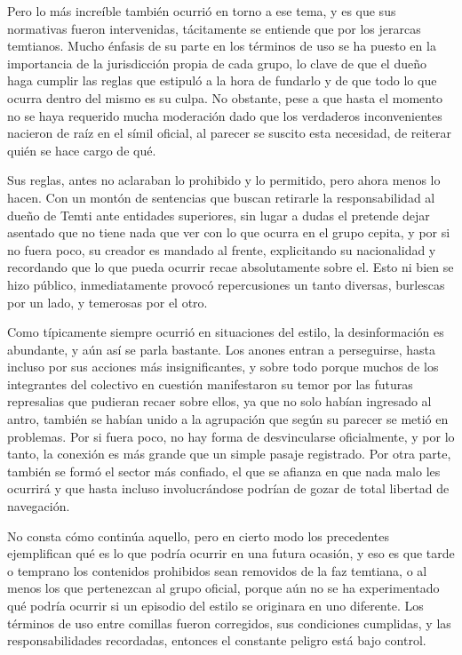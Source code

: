 \documentclass[
  spanish,
]{book}
\begin{document}
Pero lo más increíble también ocurrió en torno a ese tema, y es que sus normativas fueron intervenidas, tácitamente se entiende que por los jerarcas temtianos. Mucho énfasis de su parte en los términos de uso se ha puesto en la importancia de la jurisdicción propia de cada grupo, lo clave de que el dueño haga cumplir las reglas que estipuló a la hora de fundarlo y de que todo lo que ocurra dentro del mismo es su culpa. No obstante, pese a que hasta el momento no se haya requerido mucha moderación dado que los verdaderos inconvenientes nacieron de raíz en el símil oficial, al parecer se suscito esta necesidad, de reiterar quién se hace cargo de qué.

Sus reglas, antes no aclaraban lo prohibido y lo permitido, pero ahora menos lo hacen. Con un montón de sentencias que buscan retirarle la responsabilidad al dueño de Temti ante entidades superiores, sin lugar a dudas el pretende dejar asentado que no tiene nada que ver con lo que ocurra en el grupo cepita, y por si no fuera poco, su creador es mandado al frente, explicitando su nacionalidad y recordando que lo que pueda ocurrir recae absolutamente sobre el. Esto ni bien se hizo público, inmediatamente provocó repercusiones un tanto diversas, burlescas por un lado, y temerosas por el otro.

Como típicamente siempre ocurrió en situaciones del estilo, la desinformación es abundante, y aún así se parla bastante. Los anones entran a perseguirse, hasta incluso por sus acciones más insignificantes, y sobre todo porque muchos de los integrantes del colectivo en cuestión manifestaron su temor por las futuras represalias que pudieran recaer sobre ellos, ya que no solo habían ingresado al antro, también se habían unido a la agrupación que según su parecer se metió en problemas. Por si fuera poco, no hay forma de desvincularse oficialmente, y por lo tanto, la conexión es más grande que un simple pasaje registrado. Por otra parte, también se formó el sector más confiado, el que se afianza en que nada malo les ocurrirá y que hasta incluso involucrándose podrían de gozar de total libertad de navegación.

No consta cómo continúa aquello, pero en cierto modo los precedentes ejemplifican qué es lo que podría ocurrir en una futura ocasión, y eso es que tarde o temprano los contenidos prohibidos sean removidos de la faz temtiana, o al menos los que pertenezcan al grupo oficial, porque aún no se ha experimentado qué podría ocurrir si un episodio del estilo se originara en uno diferente. Los términos de uso entre comillas fueron corregidos, sus condiciones cumplidas, y las responsabilidades recordadas, entonces el constante peligro está bajo control.
\end{document}
